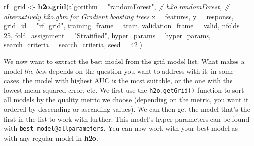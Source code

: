 \documentclass[]{article}
\newenvironment{Shaded}{\begin{snugshade}}{\end{snugshade}}
\newcommand{\KeywordTok}[1]{\textcolor[rgb]{0.13,0.29,0.53}{\textbf{{#1}}}}
\newcommand{\DataTypeTok}[1]{\textcolor[rgb]{0.13,0.29,0.53}{{#1}}}
\newcommand{\DecValTok}[1]{\textcolor[rgb]{0.00,0.00,0.81}{{#1}}}
\newcommand{\StringTok}[1]{\textcolor[rgb]{0.31,0.60,0.02}{{#1}}}
\newcommand{\CommentTok}[1]{\textcolor[rgb]{0.56,0.35,0.01}{\textit{{#1}}}}
\newcommand{\NormalTok}[1]{{#1}}
\begin{document}
\begin{Shaded}
\begin{Highlighting}[]
\NormalTok{rf_grid <-}\StringTok{ }\KeywordTok{h2o.grid}\NormalTok{(}\DataTypeTok{algorithm =} \StringTok{"randomForest"}\NormalTok{, }\CommentTok{# h2o.randomForest, }
                                                \CommentTok{# alternatively h2o.gbm for Gradient boosting trees}
                    \DataTypeTok{x =} \NormalTok{features,}
                    \DataTypeTok{y =} \NormalTok{response,}
                    \DataTypeTok{grid_id =} \StringTok{"rf_grid"}\NormalTok{,}
                    \DataTypeTok{training_frame =} \NormalTok{train,}
                    \DataTypeTok{validation_frame =} \NormalTok{valid,}
                    \DataTypeTok{nfolds =} \DecValTok{25}\NormalTok{,                           }
                    \DataTypeTok{fold_assignment =} \StringTok{"Stratified"}\NormalTok{,}
                    \DataTypeTok{hyper_params =} \NormalTok{hyper_params,}
                    \DataTypeTok{search_criteria =} \NormalTok{search_criteria,}
                    \DataTypeTok{seed =} \DecValTok{42}
                    \NormalTok{)}
\end{Highlighting}
\end{Shaded}

We now want to extract the best model from the grid model list. What
makes a model \emph{the best} depends on the question you want to
address with it: in some cases, the model with highest AUC is the most
suitable, or the one with the lowest mean squared error, etc. We first
use the \texttt{h2o.getGrid()} function to sort all models by the
quality metric we choose (depending on the metric, you want it ordered
by descending or ascending values). We can then get the model that's the
first in the list to work with further. This model's hyper-parameters
can be found with \texttt{best\_model@allparameters}. You can now work
with your best model as with any regular model in \textbf{h2o}.
\end{document}
